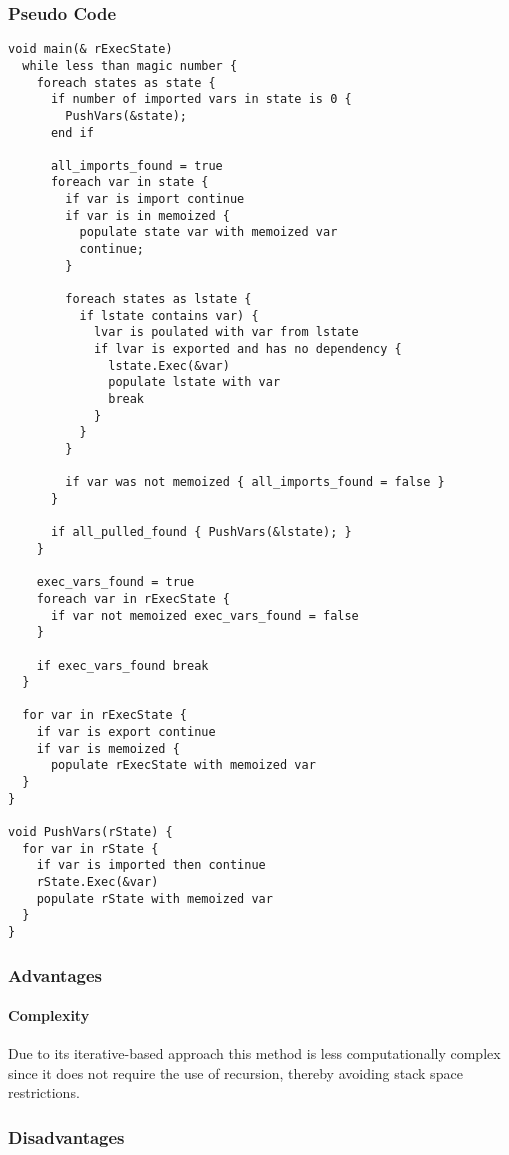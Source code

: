 \documentclass[11pt,twocolumn]{article}
\begin{document}
\subsubsection{Pseudo Code}
\begin{small}
\begin{verbatim}
void main(& rExecState)
  while less than magic number {
    foreach states as state {
      if number of imported vars in state is 0 {
        PushVars(&state);
      end if

      all_imports_found = true
      foreach var in state {
        if var is import continue
        if var is in memoized {
          populate state var with memoized var
          continue;
        }

        foreach states as lstate {
          if lstate contains var) {
            lvar is poulated with var from lstate
            if lvar is exported and has no dependency {
              lstate.Exec(&var)
              populate lstate with var
              break
            }
          }
        }

        if var was not memoized { all_imports_found = false }
      }

      if all_pulled_found { PushVars(&lstate); }
    }

    exec_vars_found = true
    foreach var in rExecState {
      if var not memoized exec_vars_found = false
    }

    if exec_vars_found break
  }

  for var in rExecState {
    if var is export continue
    if var is memoized {
      populate rExecState with memoized var
  }
}

void PushVars(rState) {
  for var in rState {
    if var is imported then continue
    rState.Exec(&var)
    populate rState with memoized var
  }
}
\end{verbatim}
\end{small}

\subsubsection{Advantages}
\paragraph{Complexity}
Due to  its iterative-based approach this method is less computationally complex since it does not require the use of recursion, thereby avoiding stack space restrictions.
\subsubsection{Disadvantages}
\end{document}
